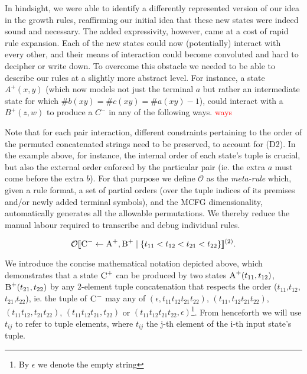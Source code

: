 \documentclass[nonatbib,numbers,10pt]{sigplanconf}
\newcommand\todo[1]{\textcolor{red}{#1}}
\newcommand\s{\textsc}
\newcommand{\Order}[5]{
	\[
	\mathcal{#1}\llbracket #2 \leftarrow #3 \mid \{ #4 \} \rrbracket^{(#5)}.
	\]
}
\newcommand{\Ord}[4]{\Order{O}{#1}{#2}{#3}{#4}}
\begin{document}
In hindsight, we were able to identify a differently represented version of our idea in the growth rules, reaffirming our initial idea that these new states were indeed sound and necessary. The added expressivity, however, came at a cost of rapid rule expansion. Each of the new states could now (potentially) interact with every other, and their means of interaction could become convoluted and hard to decipher or write down. To overcome this obstacle we needed to be able to describe our rules at a slightly more abstract level. For instance, a state $A^{+}(x,y)$ (which now models not just the terminal $a$ but rather an intermediate state for which $ \# b(xy) = \# c(xy) = \# a(xy)-1$), could interact with a $B^{+}(z,w)$ to produce a $C^{-}$ in any of the following ways.
\todo{ways}

Note that for each pair interaction, different constraints pertaining to the order of the permuted concatenated strings need to be preserved, to account for (D2). In the example above, for instance, the internal order of each state's tuple is crucial, but also the external order enforced by the particular pair (ie. the extra $a$ must come before the extra $b$). For that purpose we define $\mathcal{O}$ as the \textit{meta-rule} which, given a rule format, a set of partial orders (over the tuple indices of its premises and/or newly added terminal symbols), and the MCFG dimensionality, automatically generates all the allowable permutations. We thereby reduce the manual labour required to transcribe and debug individual rules.
\Ord{\s{C}^-}{\s{A}^+, \s{B}^+}{t_{11} < t_{12} < t_{21} < t_{22}}{2}
We introduce the concise mathematical notation depicted above, which demonstrates that a state $\textsc{C}^{+}$ can be produced by two states $\textsc{A}^{+}(t_{11},t_{12})$, $\textsc{B}^{+}(t_{21},t_{22})$ by any 2-element tuple concatenation that respects the order ($t_{11}$,$t_{12}$,$t_{21}$,$t_{22}$), ie. the tuple of $\textsc{C}^{-}$ may any of $(\epsilon, t_{11}t_{12}t_{21}t_{22})$, $(t_{11}, t_{12}t_{21}t_{22})$, $(t_{11}t_{12},t_{21}t_{22})$, $(t_{11}t_{12}t_{21},t_{22})$ or $(t_{11}t_{12}t_{21}t_{22}, \epsilon)$\footnote{By $\epsilon$ we denote the empty string}. From henceforth we will use $t_{ij}$ to refer to tuple elements, where $t_{ij}$ the j-th element of the i-th input state's tuple. 
\end{document}
